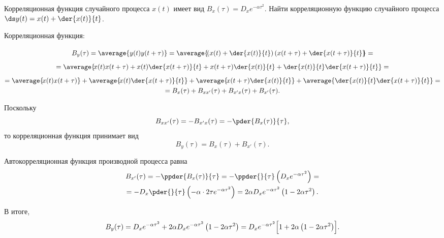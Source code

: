 \documentclass[pscyr]{hedwork}
\newcommand{\nst}{\rule{0pt}{3.0ex}}
\newcommand{\bst}{\rule{0pt}{3.5ex}}
\begin{document}
  \begin{task}{37}{
    Корреляционная функция случайного процесса \( x(t) \) имеет вид
    \( B_x(\tau) = D_x e^{-\alpha\tau^2} \). Найти корреляционную функцию
    случайного процесса \( \ds y(t) = x(t) + \der{x(t)}{t} \).
  }

    Корреляционная функция:
    \begin{gather*}
      B_y(\tau) = \average{\strut y(t)y(t+\tau)} =
        \average{\!\!\bst\left(x(t) + \der{x(t)}{t}\right)
        \left(x(t + \tau) + \der{x(t+\tau)}{t}\right)\!\!} = \\
      = \average{\!\nst x(t)x(t+\tau) + x(t)\der{x(t+\tau)}{t} +
        x(t+\tau)\der{x(t)}{t} + \der{x(t)}{t}\der{x(t+\tau)}{t}} = \\
      = \average{\!\nst x(t)x(t+\tau)} + \average{\! x(t)\der{x(t+\tau)}{t}} +
        \average{\! x(t+\tau)\der{x(t)}{t}} +
        \average{\der{x(t)}{t}\der{x(t+\tau)}{t}} = \\
      = B_x(\tau) + B_{xx'}(\tau) + B_{x'x}(\tau) + B_{x'}(\tau).
    \end{gather*}

    Поскольку
    \[
      B_{xx'}(\tau) = -B_{x'x}(\tau) = -\pder{B_x(\tau)}{\tau},
    \]
    то корреляционная функция принимает вид
    \[
      B_y(\tau) = B_x(\tau) + B_{x'}(\tau).
    \]

    Автокорреляционная функция производной процесса равна
    \begin{gather*}
      B_{x'}(\tau) = -\ppder{B_x(\tau)}{\tau} = -\ppder{}{\tau}\left(
        D_x e^{-\alpha\tau^2} \right) = \\
      = -D_x\pder{}{\tau}\left(-\alpha\cdot 2\tau e^{-\alpha\tau^2}\right) =
        2\alpha D_x e^{-\alpha\tau^2}\left(1 - 2\alpha\tau^2\right).
    \end{gather*}

    В итоге,
    \[
      B_y(\tau) = D_x e^{-\alpha\tau^2} + 2\alpha D_x e^{-\alpha\tau^2}
        \left(1 - 2\alpha\tau^2\right) = D_x e^{-\alpha\tau^2}
        \Bigl[1 + 2\alpha\left(1 - 2\alpha\tau^2\right)\Bigr].
    \]

  \end{task}
\end{document}
